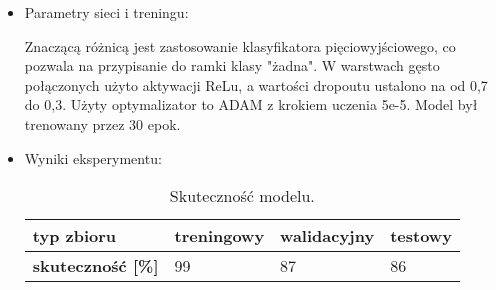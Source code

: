 \begin{itemize}
\item Parametry sieci i treningu:

Znaczącą różnicą jest zastosowanie klasyfikatora pięciowyjściowego, co pozwala na przypisanie do ramki klasy "żadna". W warstwach gęsto połączonych użyto aktywacji ReLu, a wartości dropoutu ustalono na od 0,7 do 0,3. Użyty optymalizator to ADAM z krokiem uczenia 5e-5. Model był trenowany przez 30 epok.

\item Wyniki eksperymentu:

\begin{table}[h]
\centering
\caption[Short Heading]{Skuteczność modelu.}
\begin{tabular}{|l|l|l|l|}
\hline
\textbf{typ zbioru}           & \textbf{treningowy} & \textbf{walidacyjny} & \textbf{testowy} \\ \hline
\textbf{skuteczność {[}\%{]}} & 99                  & 87                   & 86               \\ \hline
\end{tabular}
\end{table}

\end{itemize}

